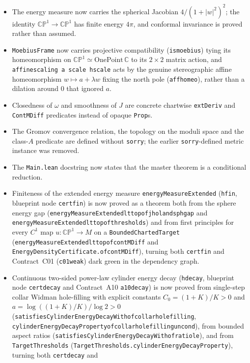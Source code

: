 \documentclass[11pt]{article}
\renewcommand{\_}{\origus\allowbreak}
\newcommand{\CP}{\mathbb{CP}^1}
\newcommand{\C}{\mathbb{C}}
\newcommand{\code}[1]{\texttt{#1}}
\begin{document}
\begin{itemize}
\item The energy measure now carries the spherical Jacobian $4/(1+|w|^2)^2$; the identity
  $\CP\to\CP$ has finite energy $4\pi$, and conformal invariance is proved rather than assumed.
\item \code{MoebiusFrame} now carries projective compatibility (\code{is\_moebius}) tying its
  homeomorphism on $\CP\simeq\mathrm{OnePoint}\,\C$ to its $2\times2$ matrix action, and
  \code{affine\_scaling a scale hscale} acts by the genuine stereographic affine homeomorphism
  $w\mapsto a+\lambda w$ fixing the north pole (\code{aff\_homeo}), rather than a dilation around
  $0$ that ignored $a$.
\item Closedness of $\omega$ and smoothness of $J$ are concrete chartwise \code{extDeriv} and
  \code{ContMDiff} predicates instead of opaque \code{Prop}s.
\item The Gromov convergence relation, the topology on the moduli space and the class-$A$
  predicate are defined without \code{sorry}; the earlier \code{sorry}-defined metric instance was
  removed.
\item The \code{Main.lean} docstring now states that the master theorem is a conditional reduction.
\item Finiteness of the extended energy measure \code{energyMeasureExtended} (\code{h\_fin},
  blueprint node \code{cert\_fin}) is now proved as a theorem both from the sphere energy gap
  (\code{energyMeasureExtended\_lt\_top\_of\_jhol\_and\_sph\_gap} and
  \code{energyMeasureExtended\_lt\_top\_of\_thresholds}) and from first principles for every $C^1$
  map $u:\CP\to M$ on a \code{BoundedChartedTarget}
  (\code{energyMeasureExtended\_lt\_top\_of\_contMDiff} and
  \code{EnergyDensityCertificate.of\_contMDiff}), turning both \code{cert\_fin} and Contract~C01
  (\code{c01\_weak}) dark green in the dependency graph.
\item Continuous two-sided power-law cylinder energy decay (\code{h\_decay}, blueprint node
  \code{cert\_decay} and Contract~A10 \code{a10\_decay}) is now proved from single-step collar Widman
  hole-filling with explicit constants $C_0=(1+K)/K>0$ and $a=\log((1+K)/K)/\log 2>0$
  (\code{satisfiesCylinderEnergyDecayWith\_of\_collar\_hole\_filling},
  \code{cylinderEnergyDecayProperty\_of\_collar\_hole\_filling\_uncond}), from bounded aspect ratios
  (\code{satisfiesCylinderEnergyDecayWith\_of\_ratio\_le}), and from \code{TargetThresholds}
  (\code{TargetThresholds.cylinderEnergyDecayProperty}), turning both \code{cert\_decay} and

\end{itemize}
\end{document}
